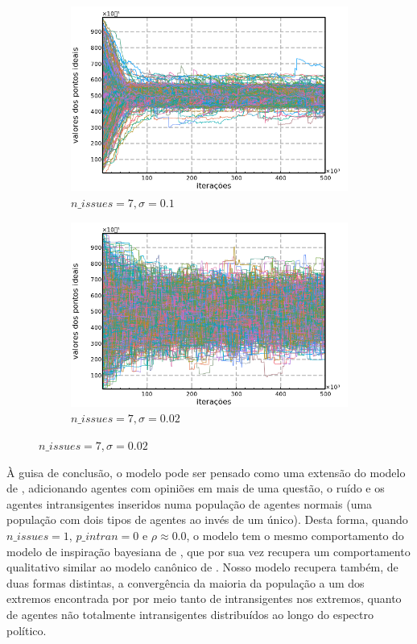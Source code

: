 \begin{figure}[H]
     \begin{subfigure}[b]{0.49\textwidth}
       \includegraphics[width=\textwidth]{ims/n7-sigma01.png}
       \caption{\(n\_issues = 7, \sigma = 0.1\)}
     \end{subfigure}
     \begin{subfigure}[b]{0.49\textwidth}
       \includegraphics[width=\textwidth]{ims/n7-sigma002.png}
       \caption{\(n\_issues = 7, \sigma = 0.02\)}
     \end{subfigure}
      \label{fig:tseries4}
    \end{figure}

    À guisa de conclusão, o modelo pode ser pensado como uma extensão do modelo
    de , adicionando agentes com opiniões em
    mais de uma questão, o ruído e os agentes intransigentes inseridos numa
    população de agentes normais (uma população com dois tipos de agentes ao
    invés de um único). Desta forma, quando \(n\_issues = 1\), \(p\_intran = 0\)
    e \(\rho \approx 0.0\), o modelo tem o mesmo comportamento do modelo de
    inspiração bayesiana de , que por sua vez
    recupera um comportamento qualitativo similar ao modelo canônico de
    . Nosso modelo recupera também, de duas
    formas distintas, a convergência da maioria da população a um dos extremos
    encontrada por  por meio tanto de intransigentes
    nos extremos, quanto de agentes não totalmente intransigentes distribuídos
    ao longo do espectro político.

